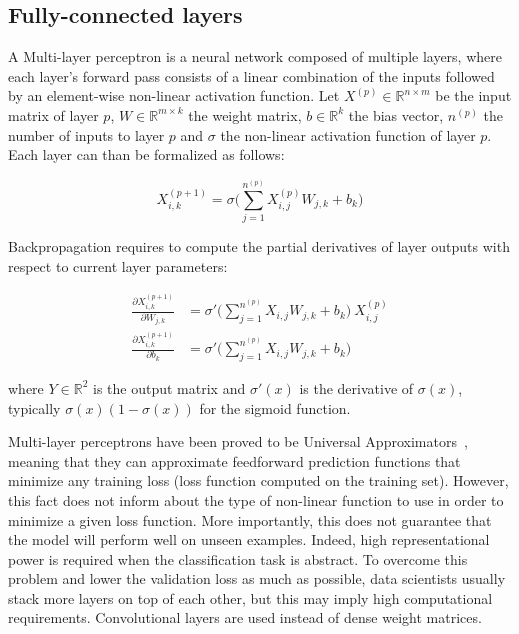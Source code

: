     \subsection{Fully-connected layers}

        A Multi-layer perceptron is a neural network composed of multiple layers,
        where each layer's forward pass consists of a linear combination of the inputs
        followed by an element-wise non-linear activation function.
        Let $X^{(p)} \in \mathbb{R}^{n \times m}$ be the input matrix of layer $p$,  %
        $W \in \mathbb{R}^{m \times k}$ the weight matrix,  %
        $b \in \mathbb{R}^{k}$ the bias vector, $n^{(p)}$ the number of inputs to layer $p$  %
        and $\sigma$ the non-linear activation function of layer $p$.
        Each layer can than be formalized as follows:

        \begin{equation}
            X_{i, k}^{(p+1)} = \sigma \Big( \sum\limits_{j=1}^{n^{(p)}} X^{(p)}_{i, j} W_{j, k} + b_{k} \Big)  %
        \end{equation}

        Backpropagation requires to compute the partial derivatives of layer outputs with respect to current layer parameters:

        \begin{align}
            \frac{\partial X_{i, k}^{(p+1)}}{\partial W_{j, k}} & = \sigma' \Big( \sum\limits_{j=1}^{n^{(p)}} X_{i, j} W_{j, k} + b_{k} \Big) \ X_{i, j}^{(p)} \\
            \frac{\partial X_{i, k}^{(p+1)}}{\partial b_{k}} & = \sigma' \Big( \sum\limits_{j=1}^{n^{(p)}} X_{i, j} W_{j, k} + b_{k} \Big)
        \end{align}

        where $Y \in \mathbb{R}^2$ is the output matrix and $\sigma'(x)$ is the derivative of $\sigma(x)$,  %
        typically $\sigma(x) (1 - \sigma(x))$ for the sigmoid function.

        Multi-layer perceptrons have been proved to be Universal Approximators~\cite{hornik1991approximation},
        meaning that they can approximate feedforward prediction functions that minimize any training loss (loss function computed on the training set).
        However, this fact does not inform about the type of non-linear function to use in order to minimize
        a given loss function. More importantly, this does not guarantee that the model will perform well on unseen examples.
        Indeed, high representational power is required when the classification task is abstract.
        To overcome this problem and lower the validation loss as much as possible, data scientists usually stack more layers on top of each other,
        but this may imply high computational requirements. Convolutional layers are used instead of dense weight matrices.


